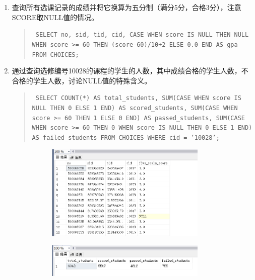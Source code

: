 \documentclass[a4paper,twoside]{article}
\begin{document}
\begin{spacing}{1.2}
\begin{enumerate}
\item 查询所有选课记录的成绩并将它换算为五分制（满分5分，合格3分），注意SCORE取NULL值的情况。
\begin{quote}
\texttt{
SELECT no, sid, tid, cid,
  CASE 
    WHEN score IS NULL THEN NULL
    WHEN score >= 60 THEN (score-60)/10+2
    ELSE 0.0
  END AS gpa
FROM CHOICES;
}
\end{quote}
\item 通过查询选修编号10028的课程的学生的人数，其中成绩合格的学生人数，不合格的学生人数，讨论NULL值的特殊含义。
\begin{quote}
\texttt{
SELECT 
  COUNT(*) AS total\_students,
  SUM(CASE WHEN score IS NULL THEN 0 ELSE 1 END) AS scored\_students,
  SUM(CASE WHEN score >= 60 THEN 1 ELSE 0 END) AS passed\_students,
  SUM(CASE WHEN score >= 60 THEN 0 WHEN score IS NULL THEN 0 ELSE 1 END) AS failed\_students
FROM CHOICES
WHERE cid = '10028';
}
\end{quote}


\begin{figure}[h]
  \centering
  \caption{运行结果}
  \begin{subfigure}{0.3\textwidth}
    \includegraphics[width=0.9\textwidth]{fig28.png}
  \end{subfigure}
  \begin{subfigure}{0.3\textwidth}
    \includegraphics[width=0.9\textwidth]{fig29.png}
  \end{subfigure}
\end{figure}


\end{enumerate}
\end{spacing}
\end{document}

